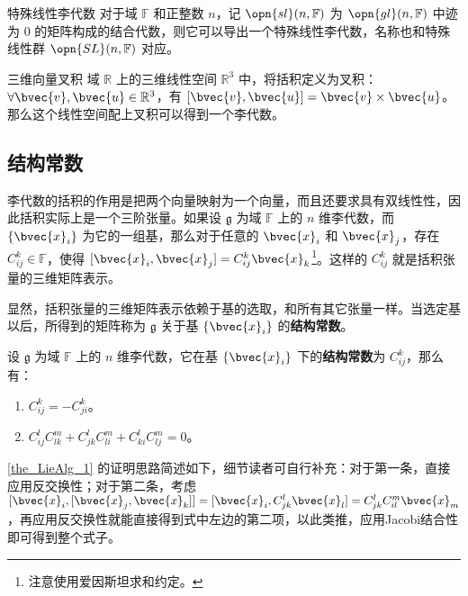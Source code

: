 \begin{example}{特殊线性李代数}
对于域 $\mathbb{F}$ 和正整数 $n$，记 $\opn{sl}(n, \mathbb{F})$ 为 $\opn{gl}(n, \mathbb{F})$ 中迹为 $0$ 的矩阵构成的结合代数，则它可以导出一个特殊线性李代数，名称也和特殊线性群 $\opn{SL}(n, \mathbb{F})$ 对应。
\end{example}

\begin{example}{三维向量叉积}\label{ex_LieAlg_1}
域 $\mathbb{R}$ 上的三维线性空间 $\mathbb{R}^3$ 中，将括积定义为叉积：$\forall \bvec{v}, \bvec{u}\in \mathbb{R}^3$，有 $[\bvec{v}, \bvec{u}]=\bvec{v}\times\bvec{u}$。那么这个线性空间配上叉积可以得到一个李代数。
\end{example}

\subsection{结构常数}

李代数的括积的作用是把两个向量映射为一个向量，而且还要求具有双线性性，因此括积实际上是一个三阶张量。如果设 $\mathfrak{g}$ 为域 $\mathbb{F}$ 上的 $n$ 维李代数，而 $\{\bvec{x}_i\}$ 为它的一组基，那么对于任意的 $\bvec{x}_i$ 和 $\bvec{x}_j$，存在 $C^k_{ij}\in\mathbb{F}$，使得 $[\bvec{x}_i, \bvec{x}_j]=C^k_{ij}\bvec{x}_k$\footnote{注意使用爱因斯坦求和约定。}。这样的 $C^k_{ij}$ 就是括积张量的三维矩阵表示。

显然，括积张量的三维矩阵表示依赖于基的选取，和所有其它张量一样。当选定基以后，所得到的矩阵称为 $\mathfrak{g}$ 关于基 $\{\bvec{x}_i\}$ 的\textbf{结构常数}。

\begin{theorem}{}\label{the_LieAlg_1}
设 $\mathfrak{g}$ 为域 $\mathbb{F}$ 上的 $n$ 维李代数，它在基 $\{\bvec{x}_i\}$ 下的\textbf{结构常数}为 $C^k_{ij}$，那么有：
\begin{enumerate}
\item $C^k_{ij}=-C^k_{ji}$。
\item $C^l_{ij}C^m_{lk}+C^l_{jk}C^m_{li}+C^l_{ki}C^m_{lj}=0$。
\end{enumerate}
\end{theorem}

\autoref{the_LieAlg_1} 的证明思路简述如下，细节读者可自行补充：对于第一条，直接应用反交换性；对于第二条，考虑 $[\bvec{x}_i, [\bvec{x}_j, \bvec{x}_k]] = [\bvec{x}_i, C_{jk}^l \bvec{x}_l] = C_{jk}^l C_{il}^m \bvec{x}_m$，再应用反交换性就能直接得到式中左边的第二项，以此类推，应用Jacobi结合性即可得到整个式子。

